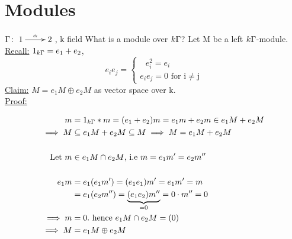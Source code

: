 \section{Modules}

\begin{exam}
	$\Gamma\colon \xymatrix{1\ar[r]^\alpha & 2}$, k field
	What is a module over $k\Gamma$? Let M be a left $k\Gamma$-module.
	\underline{Recall:} 
	$1_{k\Gamma}=e_1 + e_2$, \[e_ie_j=  
	\begin{cases}	\text{\ $e_i^2 = e_i$}\\
	\text{$e_ie_j = 0$ for i$\neq$j}
	\end{cases}\]
	\underline{Claim:} $M = e_1M\oplus e_2M$ as vector space over k.\\\newline
	\underline{Proof:}
	
	\begin{align*}
	m &= 1_{k\Gamma}*m=(e_1 + e_2)m = e_1m+e_2m \in e_1M + e_2M\\
	\implies M &\subseteq e_1M + e_2M \subseteq M \implies M = e_1M + e_2M\\\\
	\text{Let } m&\in e_1M \cap e_2M \text{, i.e } m=e_1m'=e_2m''\\\\
	e_1m&=e_1(e_1m')=(e_1e_1)m'=e_1m'=m\\
	&= e_1(e_2m'')=\underbrace{(e_1e_2)m''}_{=0}=0\cdot m''=0\\
	\implies m &=0. \text{ hence } e_1M \cap e_2M = (0)\\
	\implies M &= e_1M \oplus e_2M\\ 
	\end{align*}
\end{exam}

